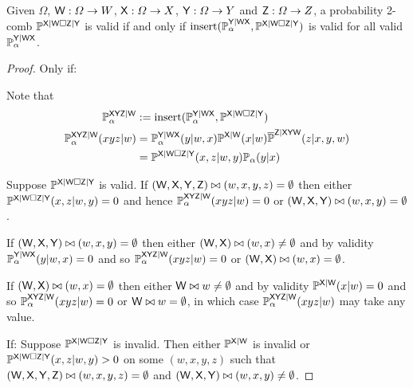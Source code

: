 \begin{theorem}\label{th:extension_2comb_valid}
Given $\Omega$, $\mathsf{W}:\Omega\to W$, $\mathsf{X}:\Omega\to X$, $\mathsf{Y}:\Omega\to Y$ and $\mathsf{Z}:\Omega\to Z$, a probability 2-comb $\mathbb{P}^{\mathsf{X}|\mathsf{W}\square\mathsf{Z}|\mathsf{Y}}$ is valid if and only if $\text{insert}(\mathbb{P}_\alpha^{\mathsf{Y}|\mathsf{WX}},\mathbb{P}^{\mathsf{X}|\mathsf{W}\square\mathsf{Z}|\mathsf{Y}})$ is valid for all valid $\mathbb{P}_\alpha^{\mathsf{Y}|\mathsf{WX}}$.
\end{theorem}

\begin{proof}
Only if:

Note that
\begin{align}
	\mathbb{P}_\alpha^{\mathsf{XYZ}|\mathsf{W}}&:=\text{insert}(\mathbb{P}_\alpha^{\mathsf{Y}|\mathsf{WX}},\mathbb{P}^{\mathsf{X}|\mathsf{W}\square\mathsf{Z}|\mathsf{Y}})\\
	\mathbb{P}_\alpha^{\mathsf{XYZ}|\mathsf{W}}(xyz|w) &= \mathbb{P}^{\mathsf{Y}|\mathsf{WX}}_\alpha(y|w,x)\mathbb{P}^{\mathsf{X}|\mathsf{W}}(x|w)\overline{\mathbb{P}}^{\mathsf{Z}|\mathsf{XYW}}(z|x,y,w)\\
	&= \mathbb{P}^{\mathsf{X}|\mathsf{W}\square\mathsf{Z}|\mathsf{Y}}(x,z|w,y)\mathbb{P}_\alpha(y|x)
\end{align}

Suppose $\mathbb{P}^{\mathsf{X}|\mathsf{W}\square\mathsf{Z}|\mathsf{Y}}$ is valid. If $(\mathsf{W},\mathsf{X},\mathsf{Y},\mathsf{Z})\bowtie(w,x,y,z)=\emptyset$ then either $\mathbb{P}^{\mathsf{X}|\mathsf{W}\square\mathsf{Z}|\mathsf{Y}}(x,z|w,y)=0$ and hence $\mathbb{P}_\alpha^{\mathsf{XYZ}|\mathsf{W}}(xyz|w)=0$ or $(\mathsf{W},\mathsf{X},\mathsf{Y})\bowtie(w,x,y)=\emptyset$.

If $(\mathsf{W},\mathsf{X},\mathsf{Y})\bowtie(w,x,y)=\emptyset$ then either $(\mathsf{W},\mathsf{X})\bowtie (w,x)\neq\emptyset$ and by validity $\mathbb{P}^{\mathsf{Y}|\mathsf{WX}}_\alpha(y|w,x)=0$ and so $\mathbb{P}_\alpha^{\mathsf{XYZ}|\mathsf{W}}(xyz|w)=0$ or $(\mathsf{W},\mathsf{X})\bowtie(w,x)=\emptyset$.

If $(\mathsf{W},\mathsf{X})\bowtie(w,x)=\emptyset$ then either $\mathsf{W}\bowtie w\neq \emptyset$ and by validity $\mathbb{P}^{\mathsf{X}|\mathsf{W}}(x|w)=0$ and so $\mathbb{P}_\alpha^{\mathsf{XYZ}|\mathsf{W}}(xyz|w)=0$ or $\mathsf{W}\bowtie w=\emptyset$, in which case $\mathbb{P}_\alpha^{\mathsf{XYZ}|\mathsf{W}}(xyz|w)$ may take any value.

If:
Suppose $\mathbb{P}^{\mathsf{X}|\mathsf{W}\square\mathsf{Z}|\mathsf{Y}}$ is invalid. Then either $\mathbb{P}^{\mathsf{X}|\mathsf{W}}$ is invalid or $\mathbb{P}^{\mathsf{X}|\mathsf{W}\square\mathsf{Z}|\mathsf{Y}}(x,z|w,y)>0$ on some $(w,x,y,z)$ such that $(\mathsf{W},\mathsf{X},\mathsf{Y},\mathsf{Z})\bowtie(w,x,y,z)= \emptyset$ and $(\mathsf{W},\mathsf{X},\mathsf{Y})\bowtie(w,x,y)\neq \emptyset$.


\end{proof}
